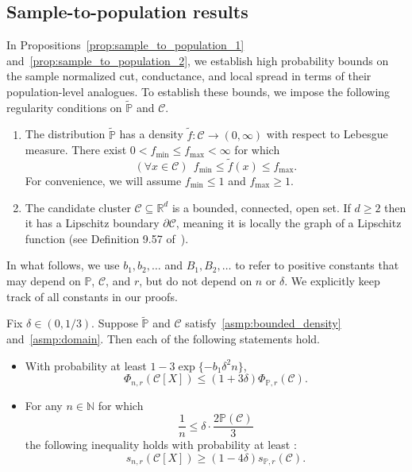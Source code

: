 \documentclass[11pt,twoside]{article}
\newcommand{\Reals}{\mathbb{R}}
\newcommand{\1}{\mathbf{1}}
\newcommand{\Rd}{\Reals^d}
\newcommand{\mc}[1]{\mathcal{#1}}
\newcommand{\Pbb}{\mathbb{P}}
\newcommand{\wt}[1]{\widetilde{#1}}
\begin{document}
\subsection{Sample-to-population results}
\label{subsec:sample_to_population}
In Propositions~\ref{prop:sample_to_population_1} and~\ref{prop:sample_to_population_2}, we establish high probability bounds on the sample normalized cut, conductance, and local spread in terms of their population-level analogues. To establish these bounds, we impose the following regularity conditions on $\wt{\Pbb}$ and $\mc{C}$.
\begin{enumerate}[label=(A\arabic*)]
	\item 
	\label{asmp:bounded_density} 
	The distribution $\wt{\Pbb}$ has a density $\wt{f}: \mc{C} \to (0,\infty)$ with respect to Lebesgue measure. There exist $0 < f_{\min} \leq f_{\max} < \infty$ for which
	\begin{equation*}
	(\forall x \in \mc{C})~~ f_{\min} \leq \wt{f}(x) \leq f_{\max}.
	\end{equation*}
	For convenience, we will assume $f_{\min} \leq 1$ and $f_{\max} \geq 1$.
	\item 
	\label{asmp:domain} 
	The candidate cluster $\mc{C} \subseteq \Rd$ is a bounded, connected, open set. If $d \geq 2$ then it has a Lipschitz boundary $\partial \mc{C}$, meaning it is locally the graph of a Lipschitz function (see Definition 9.57 of~\cite{leoni2017}).
\end{enumerate}
In what follows, we use $b_1,b_2,\ldots$ and $B_1,B_2,\ldots$ to refer to positive constants that may depend on $\Pbb$, $\mc{C}$, and $r$, but do not depend on $n$ or $\delta$. We explicitly keep track of all constants in our proofs.
\begin{proposition}
	\label{prop:sample_to_population_1}
	Fix $\delta \in (0,1/3)$. Suppose $\wt{\Pbb}$ and $\mc{C}$ satisfy~\ref{asmp:bounded_density} and~\ref{asmp:domain}. Then each of the following statements hold.
	\begin{itemize}
		\item With probability at least $1 - 3\exp\{-b_1\delta^2n\}$,
		\begin{equation}
		\label{eqn:sample_to_population_normalized_cut}
		\Phi_{n,r}(\mc{C}[X]) \leq (1 + 3\delta) \Phi_{\Pbb,r}(\mc{C}).
		\end{equation}
		\item For any $n \in \mathbb{N}$ for which 
		\begin{equation}
		\label{eqn:sample_to_population_local_spread_sample_complexity}
		\frac{1}{n} \leq \delta \cdot \frac{2\Pbb(\mc{C})}{3}
		\end{equation}
		the following inequality holds with probability at least :
		\begin{equation}
		\label{eqn:sample_to_population_local_spread}
		s_{n,r}(\mc{C}[X]) \geq (1 - 4\delta) s_{\Pbb,r}(\mc{C}).
		\end{equation}
	\end{itemize}
\end{proposition}
\end{document}
